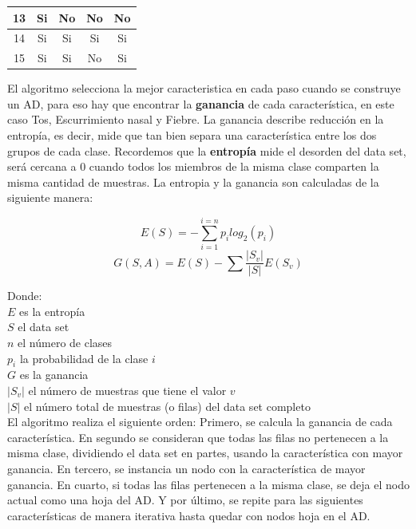 \documentclass[twoside,spanish,ESP,MSc]{plantillaLabUPV}
\theoremstyle{definition}
\begin{document}
\begin{table}[h]
\begin{tabular}{|c|c|c|c|c|}
		13          & Si           & No                                                                     & No              & No             \\ \hline
		14          & Si           & Si                                                                     & Si              & Si             \\ \hline
		15          & Si           & Si                                                                     & No              & Si             \\ \hline
	\end{tabular}
\end{table}

El algoritmo selecciona la mejor caracteristica en cada paso cuando se construye un AD, para eso hay que encontrar la \textbf{ganancia} de cada característica, en este caso Tos, Escurrimiento nasal y Fiebre. La ganancia describe reducción en la entropía, es decir, mide que tan bien separa una característica entre los dos grupos de cada clase. Recordemos que la \textbf{entropía} mide el desorden del data set, será cercana a 0 cuando todos los miembros de la misma clase comparten la misma cantidad de muestras. La entropia y la ganancia son calculadas de la siguiente manera:

 $$E(S) = -\sum_{i=1}^{i=n} p_i log_{2}(p_i)$$
 $$G(S,A)= E(S) - \sum\frac{|S_v|}{|S|} E(S_v)$$
 
 Donde:\\
 $E$ es la entropía\\
 $S$ el data set\\
 $n$ el número de clases\\
 $p_i$ la probabilidad de la clase $i$\\
 $G$ es la ganancia\\
 $|S_v|$ el número de muestras que tiene el valor $v$ \\
 $|S|$ el número total de muestras (o filas) del data set completo\\
 
 El algoritmo realiza el siguiente orden: Primero, se calcula la ganancia de cada característica. En segundo se consideran que todas las filas no pertenecen a la misma clase, dividiendo el data set en partes, usando la característica con mayor ganancia. En tercero, se instancia un nodo con la característica de mayor ganancia. En cuarto, si todas las filas pertenecen a la misma clase, se deja el nodo actual como una hoja del AD. Y por último, se repite para las siguientes características de manera iterativa hasta quedar con nodos hoja en el AD.
 
\end{document}
